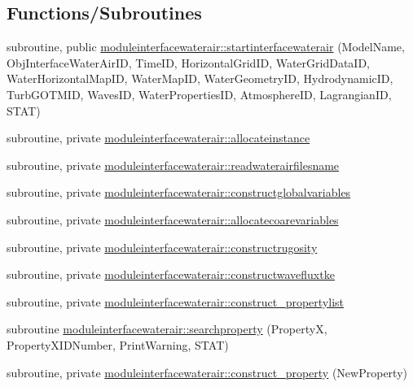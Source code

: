 \subsection*{Functions/\+Subroutines}
\begin{DoxyCompactItemize}
\item 
subroutine, public \mbox{\hyperlink{namespacemoduleinterfacewaterair_a1d15121ff2d6a7ec0e45dffd0506037a}{moduleinterfacewaterair\+::startinterfacewaterair}} (Model\+Name, Obj\+Interface\+Water\+Air\+ID, Time\+ID, Horizontal\+Grid\+ID, Water\+Grid\+Data\+ID, Water\+Horizontal\+Map\+ID, Water\+Map\+ID, Water\+Geometry\+ID, Hydrodynamic\+ID, Turb\+G\+O\+T\+M\+ID, Waves\+ID, Water\+Properties\+ID, Atmosphere\+ID, Lagrangian\+ID, S\+T\+AT)
\item 
subroutine, private \mbox{\hyperlink{namespacemoduleinterfacewaterair_aac230f23ec15f17b04185abc9c918ba1}{moduleinterfacewaterair\+::allocateinstance}}
\item 
subroutine, private \mbox{\hyperlink{namespacemoduleinterfacewaterair_a8a015dc245f72a1e32671973e4ef4538}{moduleinterfacewaterair\+::readwaterairfilesname}}
\item 
subroutine, private \mbox{\hyperlink{namespacemoduleinterfacewaterair_aade4da5319abf6cc9115d08e4cfb448b}{moduleinterfacewaterair\+::constructglobalvariables}}
\item 
subroutine, private \mbox{\hyperlink{namespacemoduleinterfacewaterair_ad1e0a14ea6e30cf93be9661a4a71a0f7}{moduleinterfacewaterair\+::allocatecoarevariables}}
\item 
subroutine, private \mbox{\hyperlink{namespacemoduleinterfacewaterair_ae5a4815896d07094361faa53fb69aa03}{moduleinterfacewaterair\+::constructrugosity}}
\item 
subroutine, private \mbox{\hyperlink{namespacemoduleinterfacewaterair_af474bb755901d845cb8a0f3efa8ffcbe}{moduleinterfacewaterair\+::constructwavefluxtke}}
\item 
subroutine, private \mbox{\hyperlink{namespacemoduleinterfacewaterair_a0102df656b49a2adcbef76f5a3a9e6d0}{moduleinterfacewaterair\+::construct\+\_\+propertylist}}
\item 
subroutine \mbox{\hyperlink{namespacemoduleinterfacewaterair_a9b32248d73ce68c55c1d8671b779f48a}{moduleinterfacewaterair\+::searchproperty}} (PropertyX, Property\+X\+I\+D\+Number, Print\+Warning, S\+T\+AT)
\item 
subroutine, private \mbox{\hyperlink{namespacemoduleinterfacewaterair_a8f499486725a26a9dcb5b2bd07ba3af9}{moduleinterfacewaterair\+::construct\+\_\+property}} (New\+Property)

\end{DoxyCompactItemize}
